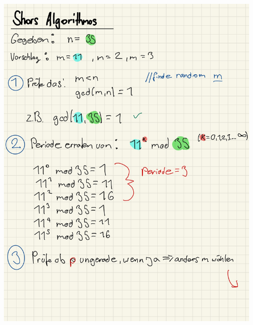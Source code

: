 \documentclass[11pt]{article}
\begin{document}
\begin{center}
	\includegraphics[scale=0.91]{img/shor1.jpg}\\
\end{center}

\break
\end{document}
